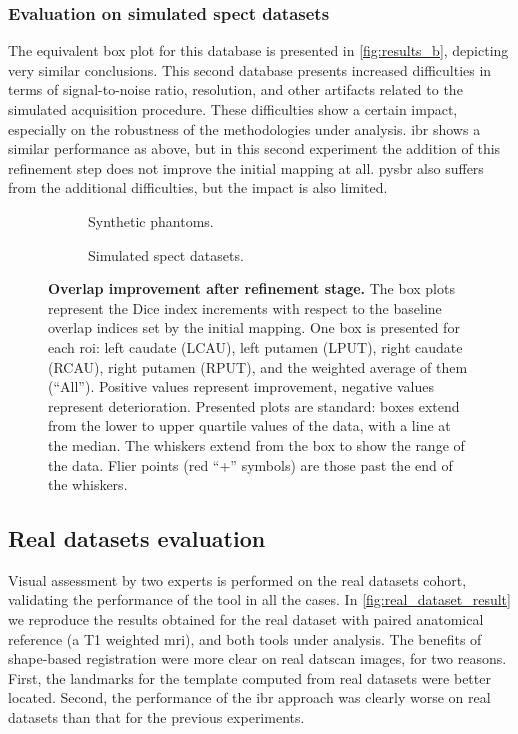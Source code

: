 \documentclass{frontiers}
\newcommand{\insertgraphic}[2]{}
\newcommand{\insertgraphic}[2]{\texttt{[image: \#2]}}
\begin{document}
\subsubsection{Evaluation on simulated \gls*{spect} datasets}
\label{sec:results_simulated}
The equivalent box plot for this database is presented in \autoref{fig:results_b},
  depicting very similar conclusions.
This second database presents increased difficulties in terms of signal-to-noise
  ratio, resolution, and other artifacts related to the simulated acquisition
  procedure.
These difficulties show a certain impact, especially on the robustness of the
  methodologies under analysis.
\Gls*{ibr} shows a similar performance as above, but in this second experiment the addition
  of this refinement step does not improve the initial mapping at all.
\Gls*{pysbr} also suffers from the additional difficulties, but the impact is
  also limited.

\begin{figure*}[ht]
\centering 
\begin{subfigure}[b]{0.61\linewidth}
\insertgraphic{width=1.0\linewidth}{figures/05-results-phantoms}
\caption{\label{fig:results_a}
Synthetic phantoms.
}
\end{subfigure}
\hfill
\begin{subfigure}[b]{0.33\linewidth}
\insertgraphic{width=1.0\linewidth}{figures/05-results-simulated}
\caption{\label{fig:results_b}
Simulated \gls*{spect} datasets.
}
\end{subfigure}

\caption{\label{fig:results}
\textbf{Overlap improvement after refinement stage.}
The box plots represent the Dice index increments with respect to the baseline overlap
  indices set by the initial mapping. One box is presented for each \gls*{roi}:
  left caudate (LCAU), left putamen (LPUT), right caudate (RCAU), right putamen (RPUT),
  and the weighted average of them (``All''). Positive values represent improvement,
  negative values represent deterioration.
Presented plots are standard: boxes extend from the lower to upper quartile values
  of the data, with a line at the median. The whiskers extend from the box to show
  the range of the data. Flier points (red ``+'' symbols) are those past the end of
  the whiskers.
}
\end{figure*}

\subsection{Real datasets evaluation}
\label{sec:results_real}
Visual assessment by two experts is performed on the real datasets cohort,
  validating the performance of the tool in all the cases.
In \autoref{fig:real_dataset_result} we reproduce the results obtained
  for the real dataset with paired anatomical reference (a T1 weighted \gls*{mri}),
  and both tools under analysis.
The benefits of shape-based registration were more clear on real \gls*{datscan}
  images, for two reasons.
First, the landmarks for the template computed from real datasets were 
  better located.
Second, the performance of the \gls*{ibr} approach was clearly worse on
  real datasets than that for the previous experiments.
\end{document}
